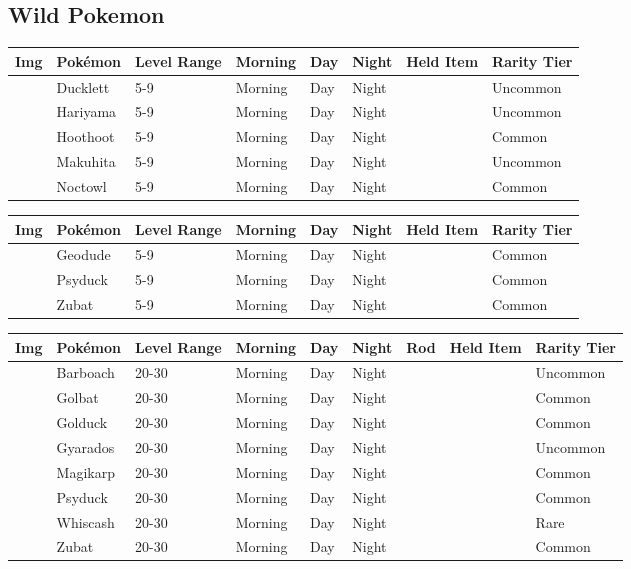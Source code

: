 \subsection{Wild Pokemon}%
\label{subsec:WildPokemon}%
\begin{longtable}{||l l l l l l l l||}%
\hline%
Img&Pokémon&Level Range&Morning&Day&Night&Held Item&Rarity Tier\\%
\hline%
\endhead%
\hline%
&Ducklett&5{-}9&Morning&Day&Night&&Uncommon\\%
\hline%
&Hariyama&5{-}9&Morning&Day&Night&&Uncommon\\%
\hline%
&Hoothoot&5{-}9&Morning&Day&Night&&Common\\%
\hline%
&Makuhita&5{-}9&Morning&Day&Night&&Uncommon\\%
\hline%
&Noctowl&5{-}9&Morning&Day&Night&&Common\\%
\hline%
\end{longtable}%
\begin{longtable}{||l l l l l l l l||}%
\hline%
Img&Pokémon&Level Range&Morning&Day&Night&Held Item&Rarity Tier\\%
\hline%
\endhead%
\hline%
&Geodude&5{-}9&Morning&Day&Night&&Common\\%
\hline%
&Psyduck&5{-}9&Morning&Day&Night&&Common\\%
\hline%
&Zubat&5{-}9&Morning&Day&Night&&Common\\%
\hline%
\end{longtable}%
\begin{longtable}{||l l l l l l l l l||}%
\hline%
Img&Pokémon&Level Range&Morning&Day&Night&Rod&Held Item&Rarity Tier\\%
\hline%
\endhead%
\hline%
&Barboach&20{-}30&Morning&Day&Night&&&Uncommon\\%
\hline%
&Golbat&20{-}30&Morning&Day&Night&&&Common\\%
\hline%
&Golduck&20{-}30&Morning&Day&Night&&&Common\\%
\hline%
&Gyarados&20{-}30&Morning&Day&Night&&&Uncommon\\%
\hline%
&Magikarp&20{-}30&Morning&Day&Night&&&Common\\%
\hline%
&Psyduck&20{-}30&Morning&Day&Night&&&Common\\%
\hline%
&Whiscash&20{-}30&Morning&Day&Night&&&Rare\\%
\hline%
&Zubat&20{-}30&Morning&Day&Night&&&Common\\%
\hline%
\end{longtable}